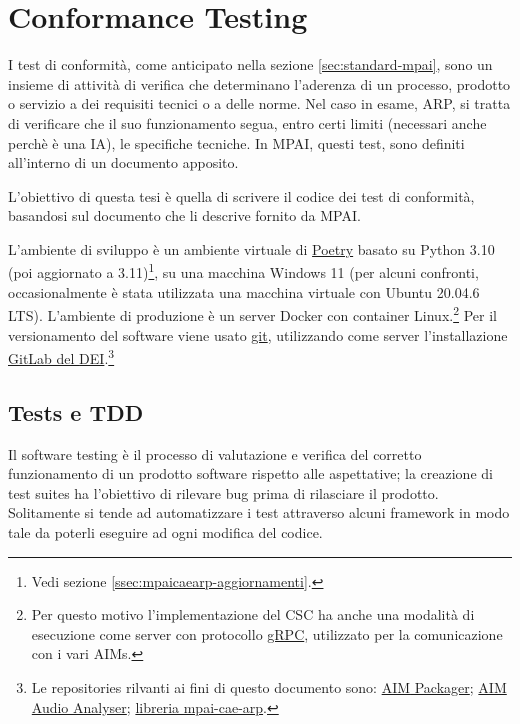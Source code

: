 
\chapter{Conformance Testing} \label{chp:conformancetesting}    %
I test di conformità, come anticipato nella sezione \ref{sec:standard-mpai}, sono un insieme di attività di verifica che determinano l'aderenza di un processo, prodotto o servizio a dei requisiti tecnici o a delle norme.
Nel caso in esame, \ac{ARP}, si tratta di verificare che il suo funzionamento segua, entro certi limiti (necessari anche perchè è una \acs{IA}), le specifiche tecniche. In \ac{MPAI}, questi test, sono definiti all'interno di un documento apposito.

L'obiettivo di questa tesi è quella di scrivere il codice dei test di conformità, basandosi sul documento che li descrive fornito da MPAI.

L'ambiente di sviluppo è un ambiente virtuale di \href{https://python-poetry.org/}{Poetry} basato su Python 3.10 (poi aggiornato a 3.11)\footnote{Vedi sezione \ref{ssec:mpaicaearp-aggiornamenti}.}, su una macchina Windows 11 (per alcuni confronti, occasionalmente è stata utilizzata una macchina virtuale con Ubuntu 20.04.6 LTS). L'ambiente di produzione è un server Docker con container Linux.\footnote{Per questo motivo l'implementazione del \ac{CSC} ha anche una modalità di esecuzione come server con protocollo \href{https://grpc.io/}{gRPC}, utilizzato per la comunicazione con i vari \acp{AIM}.} Per il versionamento del software viene usato \href{https://git-scm.com/}{git}, utilizzando come server l'installazione \href{https://gitlab.dei.unipd.it/}{GitLab del \ac{DEI}}.\footnote{Le repositories rilvanti ai fini di questo documento sono: \href{https://gitlab.dei.unipd.it/mpai/packager}{\ac{AIM} Packager}; \href{https://gitlab.dei.unipd.it/mpai/audio-analyzer}{\ac{AIM} Audio Analyser}; \href{https://gitlab.dei.unipd.it/mpai/mpai-cae-arp}{libreria mpai-cae-arp}.}


\section{Tests e \acl{TDD}} \label{sec:tests-tdd}
Il software testing è il processo di valutazione e verifica del corretto funzionamento di un prodotto software rispetto alle aspettative; la creazione di test suites ha l'obiettivo di rilevare bug prima di rilasciare il prodotto.
Solitamente si tende ad automatizzare i test attraverso alcuni framework in modo tale da poterli eseguire ad ogni modifica del codice.

